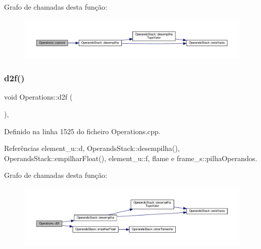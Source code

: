 Grafo de chamadas desta função\+:
\nopagebreak
\begin{figure}[H]
\begin{center}
\leavevmode
\includegraphics[width=350pt]{classOperations_a417c4833f2f048350920358961cfab03_cgraph}
\end{center}
\end{figure}
\mbox{\label{classOperations_ab5a2d770d297ace1ec0e40d3fed9f0e3}} 
\subsubsection{\texorpdfstring{d2f()}{d2f()}}
{\footnotesize\ttfamily void Operations\+::d2f (\begin{DoxyParamCaption}{ }\end{DoxyParamCaption})\hspace{0.3cm}{\ttfamily [static]}, {\ttfamily [private]}}



Definido na linha 1525 do ficheiro Operations.\+cpp.



Referências element\+\_\+u\+::d, Operands\+Stack\+::desempilha(), Operands\+Stack\+::empilhar\+Float(), element\+\_\+u\+::f, flame e frame\+\_\+s\+::pilha\+Operandos.

Grafo de chamadas desta função\+:
\nopagebreak
\begin{figure}[H]
\begin{center}
\leavevmode
\includegraphics[width=350pt]{classOperations_ab5a2d770d297ace1ec0e40d3fed9f0e3_cgraph}
\end{center}
\end{figure}
\mbox{\label{classOperations_aa8cda1c04343e047078b72b51c575e1c}} 
